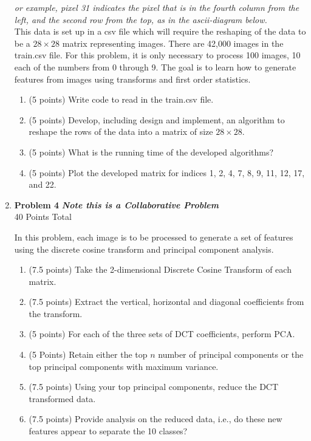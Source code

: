 \documentclass{article}
\begin{document}
\begin{enumerate}
\textit{or example, pixel 31 indicates the pixel that is in the fourth column from the left, and the second row from the top, as in the ascii-diagram below.}\\

This data is set up in a csv file which will require the reshaping of the data to be a $28 \times 28$ matrix representing images. There are 42,000 images in the train.csv file. For this problem, it is only necessary to process 100 images, 10 each of the numbers from 0 through 9. The goal is to learn how to generate features from images using transforms and first order statistics.   

	\begin{enumerate}
		\item (5 points) Write code to read in the train.csv file.
		\item (5 points) Develop, including design and implement, an algorithm to reshape the rows of the data into a matrix of size $28 \times 28$.
		\item (5 points) What is the running time of the developed algorithms?
		\item (5 points) Plot the developed matrix for indices 1, 2, 4, 7, 8, 9, 11, 12, 17, and 22.
	\end{enumerate}


\pagebreak

    \item \textbf{Problem 4 } \textbf{\emph{Note this is a Collaborative Problem}}\\
    40 Points Total

	In this problem, each image is to be processed to generate a set of features using the discrete cosine transform and principal component analysis.  

	\begin{enumerate}
		\item (7.5 points) Take the 2-dimensional Discrete Cosine Transform of each matrix.  
		\item (7.5 points) Extract the vertical, horizontal and diagonal coefficients from the transform.  
		\item (5 points) For each of the three sets of DCT coefficients, perform PCA. 
		\item (5 Points) Retain either the top $n$ number of principal components or the top  principal components with maximum variance. 
		\item (7.5 points) Using your top principal components, reduce the DCT transformed data. 
		\item (7.5 points) Provide analysis on the reduced data, i.e., do these new features appear to separate the 10 classes?  
	\end{enumerate}


\end{enumerate}
\end{document}
